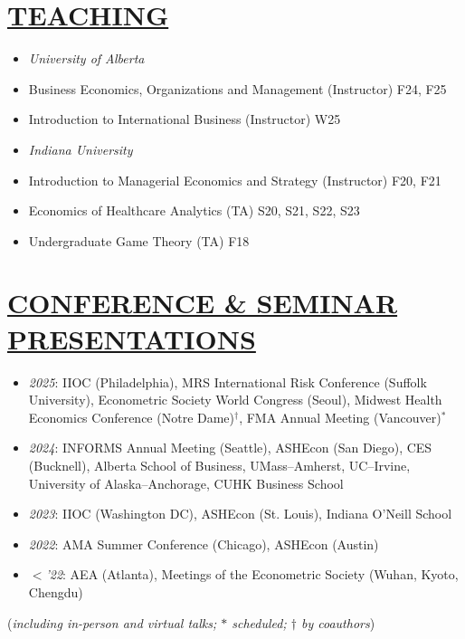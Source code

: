 \documentclass{res}
\begin{document}
\begin{resume}
\section{\large{\ul{TEACHING}}}
\vspace{1.8em}
\begin{itemize}[leftmargin=15pt,labelindent=-15pt,itemindent=-15pt,itemsep=0.1em]
\item[] \textit{University of Alberta}
    \item[] \hspace{13pt} Business Economics, Organizations and Management  (Instructor) \hfill F24, F25
    \item[] \hspace{13pt} Introduction to International Business (Instructor) \hfill W25
\item[] \textit{Indiana University}
    \item[] \hspace{13pt} Introduction to Managerial Economics and Strategy (Instructor) \hfill F20, F21
    \item[] \hspace{13pt} Economics of Healthcare Analytics (TA) \hfill S20, S21, S22, S23
    \item[] \hspace{13pt} Undergraduate Game Theory (TA) \hfill F18
\end{itemize}

\section{\large{\ul{CONFERENCE \& SEMINAR PRESENTATIONS}}}
\vspace{1.8em}
\begin{itemize}[leftmargin=15pt,labelindent=-15pt,itemindent=-15pt,itemsep=0.1em]
\item[] \textit{2025}: IIOC (Philadelphia), MRS International Risk Conference (Suffolk University), Econometric Society World Congress (Seoul), Midwest Health Economics Conference (Notre Dame)$^{\dagger}$, FMA Annual Meeting (Vancouver)$^{*}$
\item[] \textit{2024}: INFORMS Annual Meeting (Seattle), ASHEcon (San Diego), CES (Bucknell), Alberta School of Business, UMass–Amherst, UC–Irvine, University of Alaska–Anchorage, CUHK Business School
\item[] \textit{2023}: IIOC (Washington DC), ASHEcon (St. Louis), Indiana O'Neill School 
\item[] \textit{2022}: AMA Summer Conference (Chicago), ASHEcon (Austin) 
\item[] \textit{$<$'22}: AEA (Atlanta), Meetings of the Econometric Society (Wuhan, Kyoto, Chengdu)
\end{itemize}
\hfill {\small (\textit{including in-person and virtual talks; $*$ scheduled; $\dagger$ by coauthors})}

\end{resume}
\end{document}
